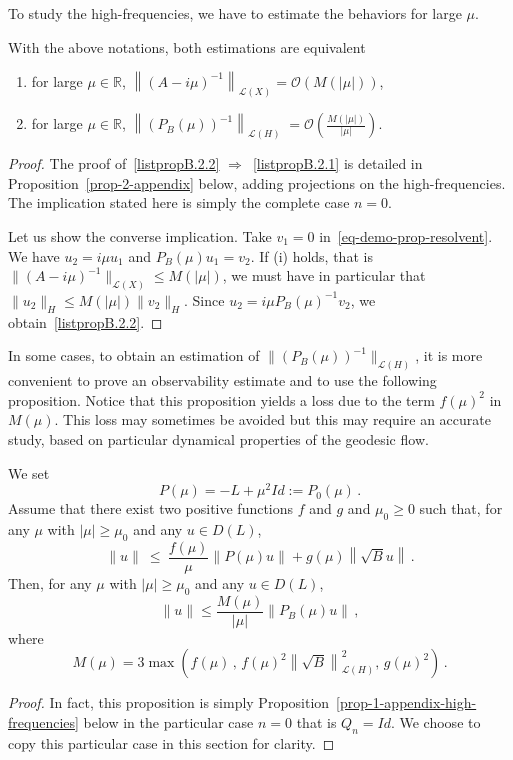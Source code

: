 \documentclass[AHL,Unicode,longabstracts]{cedram}
\newcommand{\RR}{\mathbb{R}}
\newcommand{\Lc}{\mathcal{L}}
\newcommand{\Oc}{\mathcal{O}}
\newcommand*{\romanenumi}{\renewcommand*{\theenumi}{\roman{enumi}}}
\begin{document}
To study the high-frequencies, we have to estimate the behaviors for large $\mu$.

\begin{prop}\label{prop-estimP}
With the above notations, both estimations are equivalent
\begin{enumerate}\romanenumi
\item \label{listpropB.2.1}for large $\mu\in\RR$, $\left\|(A-i\mu)^{-1}\right\|_{\Lc(X)} = \Oc (M(|\mu|))$,
\item \label{listpropB.2.2}for large $\mu\in\RR$, $\left\|(P_B(\mu))^{-1}\right\|_{\Lc(H)}\;= \Oc(
\frac{M(|\mu|)}{|\mu|})$.
\end{enumerate}
\end{prop}
\begin{proof}
The proof of~\eqref{listpropB.2.2} $\Rightarrow$~\eqref{listpropB.2.1} is detailed in Proposition~\ref{prop-2-appendix} below, adding projections on the high-frequencies. The implication stated here is simply the complete case $n=0$.

Let us show the converse implication. Take $v_1=0$ in~\eqref{eq-demo-prop-resolvent}. We have $u_2=i\mu u_1$ and $P_B(\mu)u_1 = v_2$. If (i) holds, that is $\|(A - i\mu)^{-1}\|_{\Lc(X)}\leq M(|\mu|)$, we must have in particular that $\|u_2\|_{H}\leq M(|\mu|)\|v_2\|_{H}$. Since $u_2=i\mu P_B(\mu)^{-1} v_2$, we obtain~\eqref{listpropB.2.2}.
\end{proof}


In some cases, to obtain an estimation of $\|(P_B(\mu))^{-1}\|_{\Lc(H)}$, it is more convenient to prove an observability estimate and to use the following proposition. Notice that this proposition yields a loss due to the term $f(\mu)^2$ in $M(\mu)$. This loss may sometimes be avoided but this may require an accurate study, based on particular dynamical properties of the geodesic flow.

\begin{prop}\label{prop-1-appendix}
We set
\[
P(\mu)=-L+\mu^2 Id:=P_0(\mu)\,.
\]
Assume that there exist two positive functions $f$ and $g$ and $\mu_0\geq 0$ such that, for any $\mu$ with $|\mu|\geq \mu_0$ and any $u\in D(L)$,
\begin{equation}\label{hyp-appendix}
\|u\|~\leq~\frac{f(\mu)}\mu \|P(\mu)u\| + g(\mu) \left\|\sqrt{B} u\right\|\,.
\end{equation}
Then, for any $\mu$ with $|\mu|\geq \mu_0$ and any $u\in D(L)$,
\begin{equation}\label{result-prop-1-1}
\|u\|\leq \frac{M(\mu)}{|\mu|} \|P_{B}(\mu)u\|\,,
\end{equation}
where
\begin{equation}\label{result-prop-1-3}
M(\mu)= 3 \max \left({f(\mu)}\,,\,f(\mu)^2\left\|\sqrt{B}\right\|_{\Lc(H)}^2,\, g(\mu)^2\right)\,.
\end{equation}
\end{prop}
\begin{proof}
In fact, this proposition is simply Proposition~\ref{prop-1-appendix-high-frequencies} below in the particular case $n=0$ that is $Q_n=Id$. We choose to copy this particular case in this section for clarity.
\end{proof}
\end{document}
